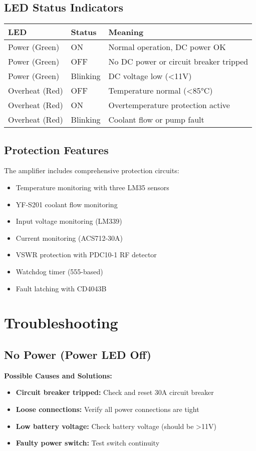 \documentclass[11pt,a4paper]{article}
\begin{document}
\subsection{LED Status Indicators}

\begin{center}
\begin{tabular}{|l|l|l|}
\hline
\textbf{LED} & \textbf{Status} & \textbf{Meaning} \\
\hline
Power (Green) & ON & Normal operation, DC power OK \\
Power (Green) & OFF & No DC power or circuit breaker tripped \\
Power (Green) & Blinking & DC voltage low (<11V) \\
\hline
Overheat (Red) & OFF & Temperature normal (<85°C) \\
Overheat (Red) & ON & Overtemperature protection active \\
Overheat (Red) & Blinking & Coolant flow or pump fault \\
\hline
\end{tabular}
\end{center}

\subsection{Protection Features}
The amplifier includes comprehensive protection circuits:
\begin{itemize}
    \item Temperature monitoring with three LM35 sensors
    \item YF-S201 coolant flow monitoring
    \item Input voltage monitoring (LM339)
    \item Current monitoring (ACS712-30A)
    \item VSWR protection with PDC10-1 RF detector
    \item Watchdog timer (555-based)
    \item Fault latching with CD4043B
\end{itemize}

\section{Troubleshooting}

\subsection{No Power (Power LED Off)}
\textbf{Possible Causes and Solutions:}
\begin{itemize}
    \item \textbf{Circuit breaker tripped:} Check and reset 30A circuit breaker
    \item \textbf{Loose connections:} Verify all power connections are tight
    \item \textbf{Low battery voltage:} Check battery voltage (should be >11V)
    \item \textbf{Faulty power switch:} Test switch continuity
\end{itemize}
\end{document}
